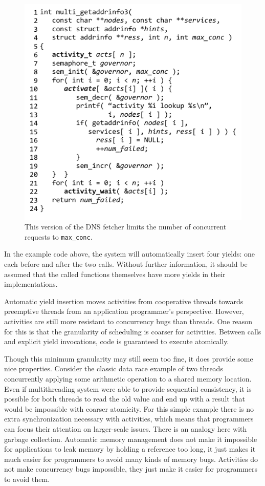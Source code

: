 \documentclass[preprint, 10pt, numbers]{sigplanconf}
\begin{document}
\begin{figure}
\includegraphics{multi_getaddrinfo_sem}
\caption{This version of the DNS fetcher limits the number of concurrent requests to \texttt{max\_conc}.}
\label{fig:charcoal_multidns_sem}
\end{figure}

In the example code above, the system will automatically insert four yields: one each before and after the two calls.
Without further information, it should be assumed that the called functions themselves have more yields in their implementations.

Automatic yield insertion moves activities from cooperative threads towards preemptive threads from an application programmer's perspective.
However, activities are still more resistant to concurrency bugs than threads.
One reason for this is that the granularity of scheduling is coarser for activities.
Between calls and explicit yield invocations, code is guaranteed to execute atomically.

Though this minimum granularity may still seem too fine, it does provide some nice properties.
Consider the classic data race example of two threads concurrently applying some arithmetic operation to a shared memory location.
Even if multithreading system were able to provide sequential consistency, it is possible for both threads to read the old value and end up with a result that would be impossible with coarser atomicity.
For this simple example there is no extra synchronization necessary with activities, which means that programmers can focus their attention on larger-scale issues.
There is an analogy here with garbage collection.
Automatic memory management does not make it impossible for applications to leak memory by holding a reference too long, it just makes it much easier for programmers to avoid many kinds of memory bugs.
Activities do not make concurrency bugs impossible, they just make it easier for programmers to avoid them.
\end{document}

